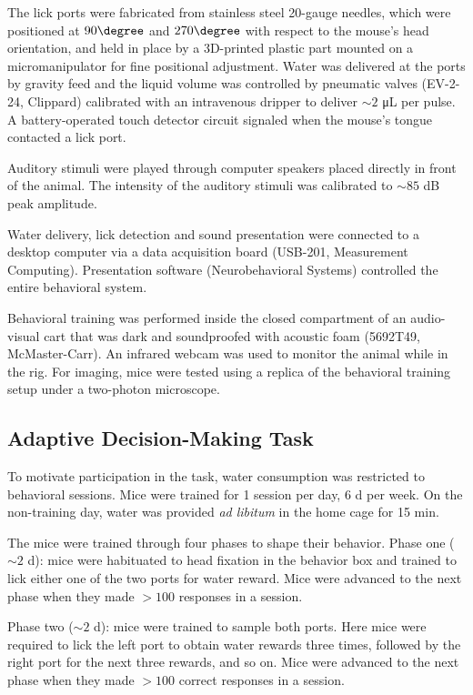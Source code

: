 The lick ports were fabricated from stainless steel 20-gauge needles, which were positioned at $90 \degree$ and $270 \degree$ with respect to the mouse's head orientation, and held in place by a 3D-printed plastic part mounted on a micromanipulator for fine positional adjustment. Water was delivered at the ports by gravity feed and the liquid volume was controlled by pneumatic valves (EV-2-24, Clippard) calibrated with an intravenous dripper to deliver $\sim 2$ \unit{\micro\liter} per pulse. A battery-operated touch detector circuit signaled when the mouse's tongue contacted a lick port. 

Auditory stimuli were played through computer speakers placed directly in front of the animal. The intensity of the auditory stimuli was calibrated to $\sim 85$ dB peak amplitude. 

Water delivery, lick detection and sound presentation were connected to a desktop computer via a data acquisition board (USB-201, Measurement Computing). Presentation software (Neurobehavioral Systems) controlled the entire behavioral system.

Behavioral training was performed inside the closed compartment of an audio-visual cart that was dark and soundproofed with acoustic foam (5692T49, McMaster-Carr). An infrared webcam was used to monitor the animal while in the rig. For imaging, mice were tested using a replica of the behavioral training setup under a two-photon microscope.

\subsection*{Adaptive Decision-Making Task}
To motivate participation in the task, water consumption was restricted to behavioral sessions. Mice were trained for 1 session per day, 6 d per week. On the non-training day, water was provided \textit{ad libitum} in the home cage for 15 min. 

The mice were trained through four phases to shape their behavior. Phase one ($\sim 2$ d): mice were habituated to head fixation in the behavior box and trained to lick either one of the two ports for water reward. Mice were advanced to the next phase when they made $>100$ responses in a session. 

Phase two ($\sim 2$ d): mice were trained to sample both ports. Here mice were required to lick the left port to obtain water rewards three times, followed by the right port for the next three rewards, and so on. Mice were advanced to the next phase when they made $> 100$ correct responses in a session. 


